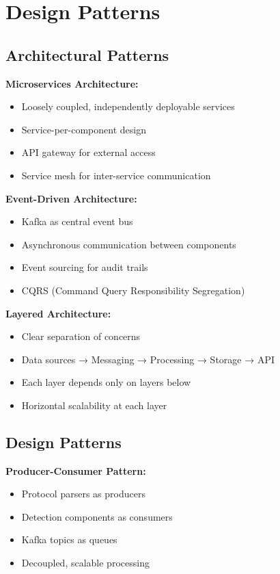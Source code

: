 \documentclass[12pt,a4paper]{article}
\begin{document}
\section{Design Patterns}

\subsection{Architectural Patterns}

\textbf{Microservices Architecture:}
\begin{itemize}[leftmargin=1cm,itemsep=0pt]
    \item Loosely coupled, independently deployable services
    \item Service-per-component design
    \item API gateway for external access
    \item Service mesh for inter-service communication
\end{itemize}

\textbf{Event-Driven Architecture:}
\begin{itemize}[leftmargin=1cm,itemsep=0pt]
    \item Kafka as central event bus
    \item Asynchronous communication between components
    \item Event sourcing for audit trails
    \item CQRS (Command Query Responsibility Segregation)
\end{itemize}

\textbf{Layered Architecture:}
\begin{itemize}[leftmargin=1cm,itemsep=0pt]
    \item Clear separation of concerns
    \item Data sources → Messaging → Processing → Storage → API
    \item Each layer depends only on layers below
    \item Horizontal scalability at each layer
\end{itemize}

\subsection{Design Patterns}

\textbf{Producer-Consumer Pattern:}
\begin{itemize}[leftmargin=1cm,itemsep=0pt]
    \item Protocol parsers as producers
    \item Detection components as consumers
    \item Kafka topics as queues
    \item Decoupled, scalable processing
\end{itemize}
\end{document}
